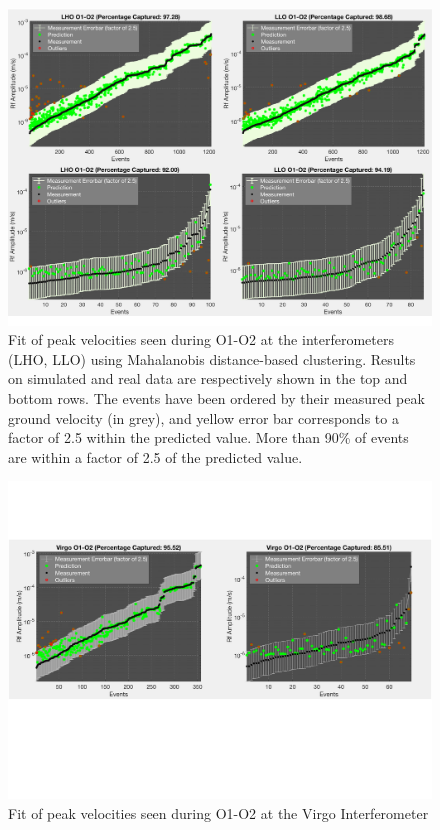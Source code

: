 \documentclass[twocolumn, aps, superscriptaddress]{revtex4}
\begin{document}
\begin{figure}[!htb]
\hspace*{-0.5cm}
 \includegraphics[width=\textwidth]{./plots/ClusteringPrediction.pdf}
 \caption{Fit of peak velocities seen during O1-O2 at the interferometers (LHO, LLO) using Mahalanobis distance-based clustering. Results on simulated and real data are respectively shown in the top and bottom rows. The events have been ordered by their measured peak ground velocity (in grey), and yellow error bar corresponds to a factor of 2.5 within the predicted value. More than 90\% of events are within a factor of 2.5 of the predicted value.}
 \label{fig:regression}
\end{figure}

\begin{figure}[!htb]
\hspace*{-0.5cm}
 \includegraphics[width=\textwidth]{./plots/ClusteringPredictionVirgo.pdf}
 \caption{Fit of peak velocities seen during O1-O2 at the Virgo Interferometer}
 \label{fig:regression}
\end{figure}
\end{document}
